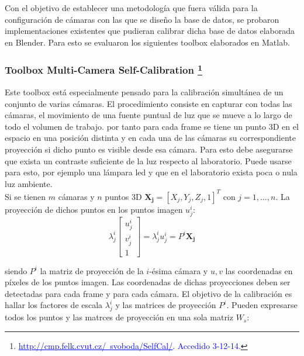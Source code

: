  Con el objetivo de establecer una metodología que fuera válida para la configuración de cámaras con las que se diseño la base de datos, se probaron implementaciones existentes que pudieran calibrar dicha base de datos elaborada en Blender. Para esto se evaluaron los siguientes toolbox elaborados en Matlab.\\ 
 
  \subsubsection{Toolbox Multi-Camera Self-Calibration \footnote{\textcolor{blue}{\underline{http://cmp.felk.cvut.cz/~svoboda/SelfCal/}. Accedido 3-12-14.}}}
 
 Este toolbox está especialmente pensado para la calibración simultánea de un conjunto de varias cámaras. El procedimiento consiste en capturar con todas las cámaras, el movimiento de una fuente puntual de luz que se mueve a lo largo de todo el volumen de trabajo. por tanto para cada frame se tiene un punto 3D en el espacio en una posición distinta y en cada una de las cámaras su correspondiente proyección si dicho punto es visible desde esa cámara. Para esto debe asegurarse que exista un contraste suficiente de la luz respecto al laboratorio. Puede usarse para esto, por ejemplo una lámpara led y que en el laboratorio exista poca o nula luz ambiente.\\
 
 
 Si se tienen $m$ cámaras y $n$ puntos 3D  
$\mathbf{X_j} = [X_j, Y_j, Z_j,1]^T$ con $j=1,\ldots,n$. La proyección de dichos puntos en los puntos imagen $u_j^i$:
\[ \lambda_j^i
\begin{bmatrix}
u_j^i \\
v_j^i \\
1
\end{bmatrix} 
 = \lambda_j^i u_j^i = P^i \mathbf{X_j}
\]

siendo $P^i$ la matriz de proyección de la $i$-ésima cámara y $u,v$ las coordenadas en píxeles de los puntos imagen. Las coordenadas de dichas proyecciones deben ser detectadas para cada frame y para cada cámara. El objetivo de la calibración es hallar los factores de escala $\lambda_j^i$ y las matrices de proyección $P^i$. Pueden expresarse todos los puntos y las matrces de proyección en una sola matriz $W_s$:

